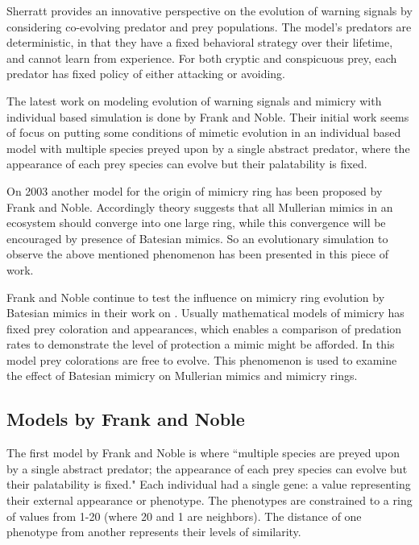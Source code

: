 Sherratt \cite{sherratt2002} provides an innovative perspective on the evolution of warning signals by considering co-evolving predator and prey populations. The model's predators are deterministic, in that they have a fixed behavioral strategy over their lifetime, and cannot learn from experience. For both cryptic and conspicuous prey, each predator has fixed policy of either attacking or avoiding.

The latest work on modeling evolution of warning signals and mimicry with individual based simulation is done by Frank and Noble. Their initial work \cite{franks2002} seems of focus on putting some conditions of mimetic evolution in an individual based model with multiple species preyed upon by a single abstract predator, where the appearance of each prey species can evolve but their palatability is fixed.

On 2003 \cite{franks2003} another model for the origin of mimicry ring has been proposed by Frank and Noble. Accordingly theory suggests that all Mullerian mimics in an ecosystem should converge into one large ring, while this convergence will be encouraged by presence of Batesian mimics. So an evolutionary simulation to observe the above mentioned phenomenon has been presented in this piece of work.

Frank and Noble continue to test the influence on mimicry ring evolution by Batesian mimics in their work on \cite{franks2004}. Usually mathematical models of mimicry has fixed prey coloration and appearances, which enables a comparison of predation rates to demonstrate the level of protection a mimic might be afforded. In this model prey colorations are free to evolve. This phenomenon is used to examine the effect of Batesian mimicry on Mullerian mimics and mimicry rings. 

\subsection{Models by Frank and Noble}
The first model by Frank and Noble \cite{franks2002} is where ``multiple species are preyed upon by a single abstract predator; the appearance of each prey species can evolve but their palatability is fixed." Each individual had a single gene: a value representing their external appearance or phenotype. The phenotypes are constrained to a ring of values from 1-20 (where 20 and 1 are neighbors). The distance of one phenotype from another represents their levels of similarity. 

